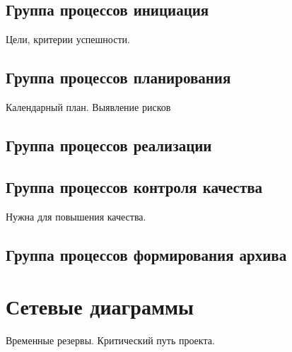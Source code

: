 \subsection{Группа процессов инициация} 
Цели, критерии успешности.
\subsection{Группа процессов планирования}
Календарный план. Выявление рисков
\subsection{Группа процессов реализации}
\subsection{Группа процессов контроля качества}
Нужна для повышения качества.
\subsection{Группа процессов формирования архива}

\section{Сетевые диаграммы}
Временные резервы. Критический путь проекта. 
